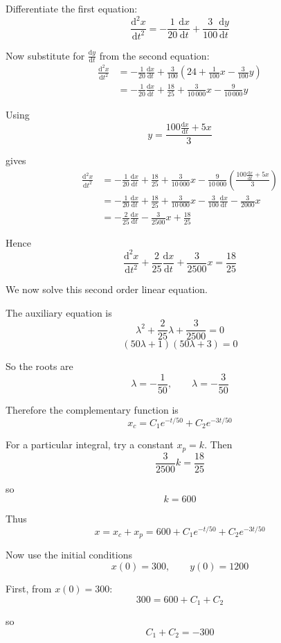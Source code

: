 \documentclass[leqno]{article}
\begin{document}
\begin{enumerate}[
  label=\textbf{\arabic*.},
  leftmargin=*,
  topsep=0pt,
  partopsep=0pt,
  parsep=0pt
]
\begin{djsSolution}
\begin{enumerate}[label=\textbf{(\alph*)}]
Differentiate the first equation:
\[
\frac{\mathrm{d}^2x}{\mathrm{d}t^2}=-\frac{1}{20}\frac{\mathrm{d}x}{\mathrm{d}t}+\frac{3}{100}\frac{\mathrm{d}y}{\mathrm{d}t}
\]

Now substitute for $\frac{\mathrm{d}y}{\mathrm{d}t}$ from the second equation:
\begin{align*}
\frac{\mathrm{d}^2x}{\mathrm{d}t^2}
&= -\frac{1}{20}\frac{\mathrm{d}x}{\mathrm{d}t}+\frac{3}{100}\left(24+\frac{1}{100}x-\frac{3}{100}y\right) \\
&= -\frac{1}{20}\frac{\mathrm{d}x}{\mathrm{d}t}+\frac{18}{25}+\frac{3}{10\,000}x-\frac{9}{10\,000}y
\end{align*}

Using
\[
y=\frac{100\frac{\mathrm{d}x}{\mathrm{d}t}+5x}{3}
\]

gives
\begin{align*}
\frac{\mathrm{d}^2x}{\mathrm{d}t^2}
&= -\frac{1}{20}\frac{\mathrm{d}x}{\mathrm{d}t}+\frac{18}{25}+\frac{3}{10\,000}x-\frac{9}{10\,000}\left(\frac{100\frac{\mathrm{d}x}{\mathrm{d}t}+5x}{3}\right) \\
&= -\frac{1}{20}\frac{\mathrm{d}x}{\mathrm{d}t}+\frac{18}{25}+\frac{3}{10\,000}x-\frac{3}{100}\frac{\mathrm{d}x}{\mathrm{d}t}-\frac{3}{2000}x \\
&= -\frac{2}{25}\frac{\mathrm{d}x}{\mathrm{d}t}-\frac{3}{2500}x+\frac{18}{25}
\end{align*}

Hence
\[
\frac{\mathrm{d}^2x}{\mathrm{d}t^2}+\frac{2}{25}\frac{\mathrm{d}x}{\mathrm{d}t}+\frac{3}{2500}x=\frac{18}{25}
\]

We now solve this second order linear equation.

The auxiliary equation is
\[
\lambda^2+\frac{2}{25}\lambda+\frac{3}{2500}=0
\]
\[
(50\lambda+1)(50\lambda+3)=0
\]

So the roots are
\[
\lambda=-\frac{1}{50},\qquad \lambda=-\frac{3}{50}
\]

Therefore the complementary function is
\[
x_c=C_1e^{-t/50}+C_2e^{-3t/50}
\]

For a particular integral, try a constant $x_p=k$. Then
\[
\frac{3}{2500}k=\frac{18}{25}
\]

so
\[
k=600
\]

Thus
\[
x=x_c+x_p=600+C_1e^{-t/50}+C_2e^{-3t/50}
\]

Now use the initial conditions
\[
x(0)=300,\qquad y(0)=1200
\]

First, from $x(0)=300$:
\[
300=600+C_1+C_2
\]

so
\[
C_1+C_2=-300
\]


\end{enumerate}
\end{djsSolution}
\end{enumerate}
\end{document}
